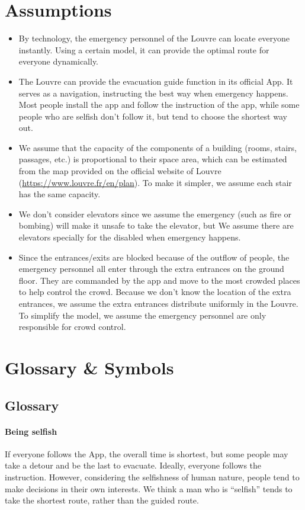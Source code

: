 \documentclass[a4paper,12pt]{article}
\begin{document}
\section{Assumptions}
\begin{itemize}
\item By technology, the emergency personnel of the Louvre can locate everyone instantly. Using a certain model, it can provide the optimal route for everyone dynamically. 
\item The Louvre can provide the evacuation guide function in its official App. It serves as a 
navigation, instructing the best way when emergency happens. Most people install the app and follow the instruction of the app, while some people who are selfish don't follow it, but tend to choose the shortest way out.
\item We assume that the capacity of the components of a building (rooms, stairs, passages, etc.) is proportional to their space area, which can be estimated from the map provided on the official website of Louvre (\url{https://www.louvre.fr/en/plan}). To make it simpler, we assume each stair has the same capacity.
\item We don't consider elevators since we assume the emergency (such as fire or bombing) will make it unsafe to take the elevator, but We assume there are elevators specially for the disabled when emergency happens.
\item Since the entrances/exits are blocked because of the outflow of people, the emergency personnel all enter through the extra entrances on the ground floor. They are commanded by the app and move to the most crowded places to help control the crowd. Because we don't know the location of the extra entrances, we assume the extra entrances distribute uniformly in the Louvre. To simplify the model, we assume the emergency personnel are only responsible for crowd control.
\end{itemize}

\section{Glossary \& Symbols} 
\subsection{Glossary}
\paragraph{Being selfish} If everyone follows the App, the overall time is shortest, but some people may take a detour and be the last to evacuate. Ideally, everyone follows the instruction. However, considering the selfishness of human nature, people tend to make decisions in their own interests. We think a man who is “selfish” tends to take the shortest route, rather than the guided route.
\end{document}
